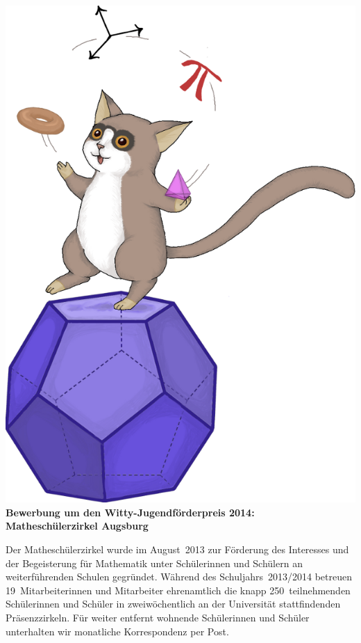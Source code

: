 \documentclass[12pt]{zettel}
\begin{document}
\pagestyle{plain}

\renewcommand{\betreff}{}


\vspace{-2em}

\begin{center}
{\qquad\quad}\includegraphics[scale=0.18]{cover}\\[1cm]

  \Large\textbf{\textsf{Bewerbung um den Witty-Jugendförderpreis 2014: \\
  Matheschülerzirkel Augsburg}}
\end{center}

\vspace{1em}

Der Matheschülerzirkel wurde im August~2013 zur Förderung des
Interesses und der Begeisterung für Mathematik unter Schülerinnen und Schülern
an weiterführenden Schulen gegründet. Während des Schuljahrs~2013/2014 betreuen
19~Mitarbeiterinnen und Mitarbeiter ehrenamtlich die knapp
250~teilnehmenden Schülerinnen und Schüler in zweiwöchentlich an der
Universität stattfindenden Präsenzzirkeln. Für weiter entfernt wohnende Schülerinnen
und Schüler unterhalten wir monatliche Korrespondenz per Post.
\end{document}
